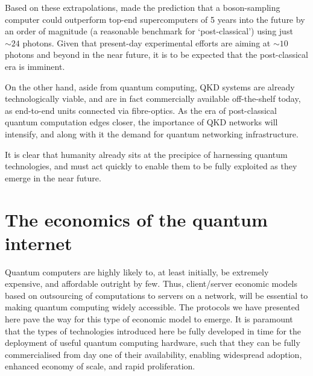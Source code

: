 \documentclass[aps,rmp,twocolumn,amsmath,amssymb,nofootinbib,superscriptaddress,longbibliography,floatfix]{revtex4-1}
\begin{document}
Based on these extrapolations, \cite{CYLu} made the prediction that a boson-sampling computer could outperform top-end supercomputers of 5 years into the future by an order of magnitude (a reasonable benchmark for `post-classical') using just $\sim 24$ photons. Given that present-day experimental efforts are aiming at $\sim 10$ photons and beyond in the near future, it is to be expected that the post-classical era is imminent.

On the other hand, aside from quantum computing, QKD systems are already technologically viable, and are in fact commercially available off-the-shelf today, as end-to-end units connected via fibre-optics. As the era of post-classical quantum computation edges closer, the importance of QKD networks will intensify, and along with it the demand for quantum networking infrastructure.

It is clear that humanity already sits at the precipice of harnessing quantum technologies, and must act quickly to enable them to be fully exploited as they emerge in the near future.

%
%

\section{The economics of the quantum internet} \label{sec:economics}

Quantum computers are highly likely to, at least initially, be extremely expensive, and affordable outright by few. Thus, client/server economic models based on outsourcing of computations to servers on a network, will be essential to making quantum computing widely accessible. The protocols we have presented here pave the way for this type of economic model to emerge. It is paramount that the types of technologies introduced here be fully developed in time for the deployment of useful quantum computing hardware, such that they can be fully commercialised from day one of their availability, enabling widespread adoption, enhanced economy of scale, and rapid proliferation.
\end{document}
